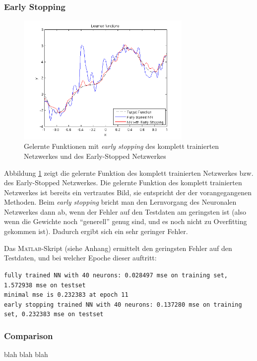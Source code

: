 \subsubsection{Early Stopping}

\begin{figure}[h!]
  \centering
  \includegraphics[width=0.75\textwidth]{./figures/3/3_1_learned_es.png}
  \caption{Gelernte Funktionen mit \emph{early stopping} des komplett trainierten Netzwerkes und des Early-Stopped Netzwerkes}
  \label{fig:3_1_learned_es}
\end{figure}

Abbildung \ref{fig:3_1_learned_es} zeigt die gelernte Funktion des komplett trainierten Netzwerkes bzw. des Early-Stopped Netzwerkes. Die gelernte Funktion des komplett trainierten Netzwerkes ist bereits ein vertrautes Bild, sie entspricht der der vorangegangenen Methoden. Beim \emph{early stopping} bricht man den Lernvorgang des Neuronalen Netzwerkes dann ab, wenn der Fehler auf den Testdaten am geringsten ist (also wenn die Gewichte noch ``generell'' genug sind, und es noch nicht zu Overfitting gekommen ist). Dadurch ergibt sich ein sehr geringer Fehler.

Das \textsc{Matlab}-Skript (siehe Anhang) ermittelt den geringsten Fehler auf den Testdaten, und bei welcher Epoche dieser auftritt:

\noindent \texttt{fully trained NN with 40 neurons: 0.028497 mse on training set, 1.572938 mse on testset\\
minimal mse is 0.232383 at epoch 11\\
early stopping trained NN with 40 neurons: 0.137280 mse on training set, 0.232383 mse on testset}


\subsubsection{Comparison}

blah blah blah
